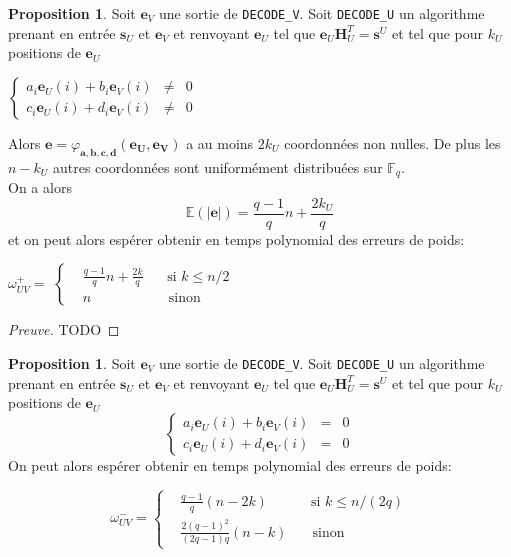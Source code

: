 \documentclass[12pt]{article}
\theoremstyle{definition}
\newtheorem{propo}[thm]{Proposition}
\newcommand{\F}{\mathbb{F}}
\begin{document}
\begin{propo} Soit $\mathbf{e}_V$ une sortie de \verb|DECODE_V|. Soit \verb|DECODE_U| un algorithme prenant en entrée $\mathbf{s}_U$ et $\mathbf{e}_V$ et renvoyant $\mathbf{e}_U$ tel que $\mathbf{e}_U\mathbf{H}_U^T = \mathbf{s}^U$ et tel que pour $k_U$ positions de $\mathbf{e}_U$ 
\begin{center}
$\left \{
\begin{array}{rcl}
a_i\mathbf{e}_U(i) + b_i\mathbf{e}_V(i) &\neq& 0 \\
c_i\mathbf{e}_U(i) + d_i\mathbf{e}_V(i) &\neq& 0
\end{array}
\right.$
\end{center}
Alors $\mathbf{e} = \varphi_{\mathbf{a},\mathbf{b},\mathbf{c},\mathbf{d}}(\mathbf{e_U},\mathbf{e_V})$ a au moins $2k_U$ coordonnées non nulles. De plus les $n-k_U$ autres coordonnées sont uniformément distribuées sur $\F_q$. \\
On a alors 
$$ \mathbb{E}(|\mathbf{e}|) = \frac{q-1}{q}n + \frac{2k_U}{q} $$
et on peut alors espérer obtenir en temps polynomial des erreurs de poids:
\begin{center}
$\omega^+_{UV} = $
$\left \{
\begin{array}{rcl}
&\frac{q-1}{q}n + \frac{2k}{q} & \;\; \text{ si } k \leq n/2 \\
&n & \quad \text{sinon}
\end{array}
\right.$
\end{center}
\end{propo}

\begin{proof}[Preuve]
TODO
\end{proof}


\begin{propo} Soit $\mathbf{e}_V$ une sortie de \verb|DECODE_V|. Soit \verb|DECODE_U| un algorithme prenant en entrée $\mathbf{s}_U$ et $\mathbf{e}_V$ et renvoyant $\mathbf{e}_U$ tel que $\mathbf{e}_U\mathbf{H}_U^T = \mathbf{s}^U$ et tel que pour $k_U$ positions de $\mathbf{e}_U$ 
\begin{equation}\label{syst petit poid}
\left \{
\begin{array}{rcl}
a_i\mathbf{e}_U(i) + b_i\mathbf{e}_V(i) &=& 0 \\
c_i\mathbf{e}_U(i) + d_i\mathbf{e}_V(i) &=& 0
\end{array}
\right.
\end{equation}
On peut alors espérer obtenir en temps polynomial des erreurs de poids:
\begin{center}
\begin{equation} 
\omega^-_{UV} = 
\left \{
\begin{array}{rcl}
&\frac{q-1}{q}(n-2k) & \;\; \text{ si } k \leq n/(2q) \\
&\frac{2(q-1)^2}{(2q-1)q}(n-k) & \quad \text{sinon}
\end{array}
\right.
\end{equation}
\end{center}
\end{propo}
\end{document}
